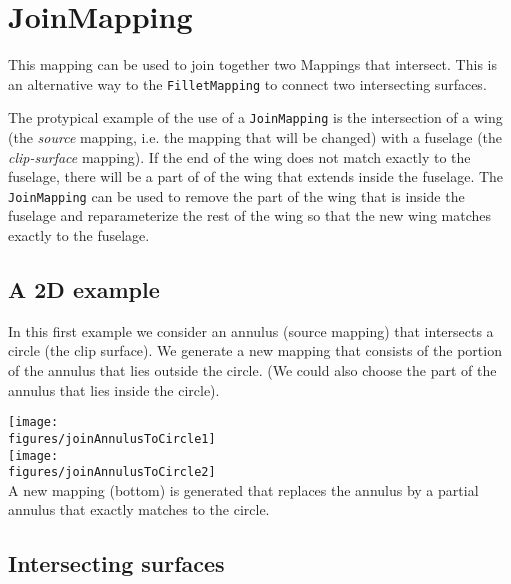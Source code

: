 \section{JoinMapping}

\newcommand{\sourceMapping}{{\sl source mapping}}
\newcommand{\clipSurface}{{\sl clip surface}}

This mapping can be used to join together two Mappings that intersect. 
This is an alternative way to the {\tt FilletMapping} to connect two intersecting surfaces.

The protypical example of the use of a {\tt JoinMapping} is the intersection of
a wing (the {\sl source} mapping, i.e. the mapping that will be changed) 
with a fuselage (the {\sl clip-surface} mapping).
If the end of the wing does not match exactly to the fuselage, there will be a part of
of the wing that extends inside the fuselage. The {\tt JoinMapping} can be used to 
remove the part of the wing that is inside the fuselage and reparameterize the rest
of the wing so that the new wing matches exactly to the fuselage. 


\subsection{A 2D example}

In this first example we consider an annulus (source mapping) that intersects a
circle (the clip surface).  We generate a new mapping that consists of the
portion of the annulus that lies outside the circle. (We could also choose the
part of the annulus that lies inside the circle).

\noindent
\begin{minipage}{.4\linewidth}
{\footnotesize
{}
}
\end{minipage}\hfill
\begin{minipage}{.6\linewidth}
  \begin{center}
  \texttt{[image: \\figures/joinAnnulusToCircle1]}\\
  \texttt{[image: \\figures/joinAnnulusToCircle2]}\\
  {A new mapping (bottom) is generated that replaces the annulus by a partial annulus that
   exactly matches to the circle.}
  \end{center}
\end{minipage}


\subsection{Intersecting surfaces}

